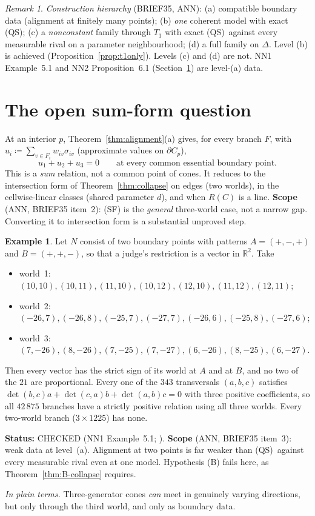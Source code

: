 \documentclass[11pt]{article}
\theoremstyle{definition}
\newtheorem{example}[theorem]{Example}
\theoremstyle{remark}
\newtheorem{remark}[theorem]{Remark}
\newcommand{\R}{\mathbb R}
\newcommand{\src}[1]{\textsf{#1}}
\newcommand{\status}[1]{\par\smallskip\noindent\textbf{Status:} #1\par}
\newcommand{\inwords}[1]{\noindent\textit{In plain terms.} #1\par\smallskip}
\newcommand{\QS}{\textup{(QS)}}
\begin{document}
\begin{remark}\label{rem:hierarchy}
\emph{Construction hierarchy} (\src{BRIEF35}, \src{ANN}):
(a) compatible boundary data (alignment at finitely many points);
(b) \emph{one} coherent model with exact \QS;
(c) a \emph{nonconstant} family through $T_1$ with exact \QS\ against every measurable rival on a parameter neighbourhood;
(d) a full family on $\Delta$.
Level (b) is achieved (Proposition~\ref{prop:t1only}). Levels (c) and (d) are not. NN1 Example~5.1 and NN2 Proposition~6.1 (Section~\ref{sec:sumform}) are level-(a) data.
\end{remark}

\section{The open sum-form question}\label{sec:sumform}

At an interior $p$, Theorem~\ref{thm:alignment}(a) gives, for every branch $F$, with $u_i\coloneqq\sum_{v\in F_i}w_{iv}\sigma_{iv}$ (approximate values on $\partial C_p$),
\[
u_1+u_2+u_3=0\qquad\text{at every common essential boundary point.}\tag{SF}
\]
This is a \emph{sum} relation, not a common point of cones. It reduces to the intersection form of Theorem~\ref{thm:collapse} on edges (two worlds), in the cellwise-linear classes (shared parameter $d$), and when $R(C)$ is a line. \textbf{Scope} (\src{ANN}, \src{BRIEF35} item~2): (SF) is the \emph{general} three-world case, not a narrow gap. Converting it to intersection form is a substantial unproved step.

\begin{example}\label{ex:NN1-51}
Let $N$ consist of two boundary points with patterns $A=(+,-,+)$ and $B=(+,+,-)$, so that a judge's restriction is a vector in $\R^2$. Take
\begin{itemize}[leftmargin=*,nosep]
\item world~1: $(10,10),(10,11),(11,10),(10,12),(12,10),(11,12),(12,11)$;
\item world~2: $(-26,7),(-26,8),(-25,7),(-27,7),(-26,6),(-25,8),(-27,6)$;
\item world~3: $(7,-26),(8,-26),(7,-25),(7,-27),(6,-26),(8,-25),(6,-27)$.
\end{itemize}
Then every vector has the strict sign of its world at $A$ and at $B$, and no two of the $21$ are proportional. Every one of the $343$ transversals $(a,b,c)$ satisfies $\det(b,c)a+\det(c,a)b+\det(a,b)c=0$ with three positive coefficients, so all $42\,875$ branches have a strictly positive relation using all three worlds. Every two-world branch ($3\times1225$) has none.
\end{example}
\status{CHECKED (\src{NN1} Example~5.1; \file{nn1py/escape_check.out}). \textbf{Scope} (\src{ANN}, \src{BRIEF35} item~3): weak data at level~(a). Alignment at two points is far weaker than \QS\ against every measurable rival even at one model. Hypothesis (B) fails here, as Theorem~\ref{thm:B-collapse} requires.}
\inwords{Three-generator cones \emph{can} meet in genuinely varying directions, but only through the third world, and only as boundary data.}
\end{document}

